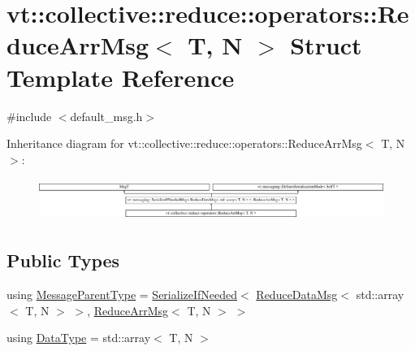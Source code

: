 \hypertarget{structvt_1_1collective_1_1reduce_1_1operators_1_1_reduce_arr_msg}{}\section{vt\+:\+:collective\+:\+:reduce\+:\+:operators\+:\+:Reduce\+Arr\+Msg$<$ T, N $>$ Struct Template Reference}
\label{structvt_1_1collective_1_1reduce_1_1operators_1_1_reduce_arr_msg}


{\ttfamily \#include $<$default\+\_\+msg.\+h$>$}

Inheritance diagram for vt\+:\+:collective\+:\+:reduce\+:\+:operators\+:\+:Reduce\+Arr\+Msg$<$ T, N $>$\+:\begin{figure}[H]
\begin{center}
\leavevmode
\includegraphics[height=1.372549cm]{structvt_1_1collective_1_1reduce_1_1operators_1_1_reduce_arr_msg}
\end{center}
\end{figure}
\subsection*{Public Types}
\begin{DoxyCompactItemize}
\item 
using \hyperlink{structvt_1_1collective_1_1reduce_1_1operators_1_1_reduce_arr_msg_a30910931cccfb82bd2eefd37c8292caa}{Message\+Parent\+Type} = \hyperlink{namespacevt_a0a4ad8c256fcffa564e9fa7800e4b495}{Serialize\+If\+Needed}$<$ \hyperlink{structvt_1_1collective_1_1reduce_1_1operators_1_1_reduce_data_msg}{Reduce\+Data\+Msg}$<$ std\+::array$<$ T, N $>$ $>$, \hyperlink{structvt_1_1collective_1_1reduce_1_1operators_1_1_reduce_arr_msg}{Reduce\+Arr\+Msg}$<$ T, N $>$ $>$
\item 
using \hyperlink{structvt_1_1collective_1_1reduce_1_1operators_1_1_reduce_arr_msg_a09afd457c37f46ed8ea06f8075195a16}{Data\+Type} = std\+::array$<$ T, N $>$
\end{DoxyCompactItemize}
